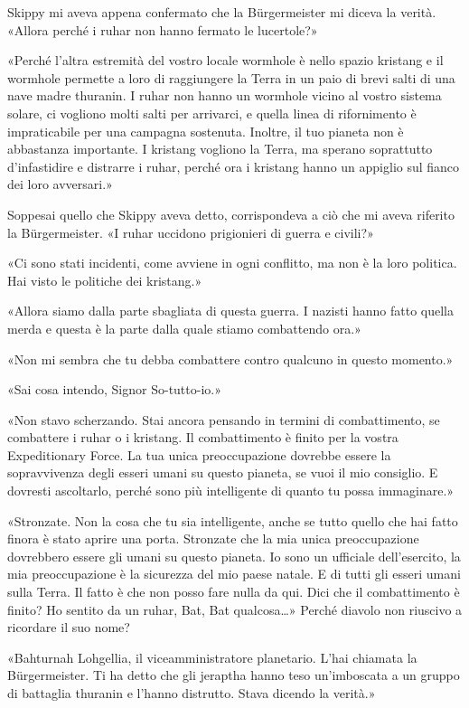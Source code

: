 Skippy mi aveva appena confermato che la Bürgermeister mi diceva la
verità. «Allora perché i ruhar non hanno fermato le lucertole?»

«Perché l'altra estremità del vostro locale wormhole è nello spazio
kristang e il wormhole permette a loro di raggiungere la Terra in un
paio di brevi salti di una nave madre thuranin. I ruhar non hanno un
wormhole vicino al vostro sistema solare, ci vogliono molti salti per
arrivarci, e quella linea di rifornimento è impraticabile per una
campagna sostenuta. Inoltre, il tuo pianeta non è abbastanza importante.
I kristang vogliono la Terra, ma sperano soprattutto d'infastidire e
distrarre i ruhar, perché ora i kristang hanno un appiglio sul fianco
dei loro avversari.»

Soppesai quello che Skippy aveva detto, corrispondeva a ciò che mi aveva
riferito la Bürgermeister. «I ruhar uccidono prigionieri di guerra e
civili?»

«Ci sono stati incidenti, come avviene in ogni conflitto, ma non è la
loro politica. Hai visto le politiche dei kristang.»

«Allora siamo dalla parte sbagliata di questa guerra. I nazisti hanno
fatto quella merda e questa è la parte dalla quale stiamo combattendo
ora.»

«Non mi sembra che tu debba combattere contro qualcuno in questo
momento.»

«Sai cosa intendo, Signor So-tutto-io.»

«Non stavo scherzando. Stai ancora pensando in termini di combattimento,
se combattere i ruhar o i kristang. Il combattimento è finito per la
vostra Expeditionary Force. La tua unica preoccupazione dovrebbe essere
la sopravvivenza degli esseri umani su questo pianeta, se vuoi il mio
consiglio. E dovresti ascoltarlo, perché sono più intelligente di quanto
tu possa immaginare.»

«Stronzate. Non la cosa che tu sia intelligente, anche se tutto quello
che hai fatto finora è stato aprire una porta. Stronzate che la mia
unica preoccupazione dovrebbero essere gli umani su questo pianeta. Io
sono un ufficiale dell'esercito, la mia preoccupazione è la sicurezza
del mio paese natale. E di tutti gli esseri umani sulla Terra. Il fatto
è che non posso fare nulla da qui. Dici che il combattimento è finito?
Ho sentito da un ruhar, Bat, Bat qualcosa\ldots» Perché diavolo non
riuscivo a ricordare il suo nome?

«Bahturnah Lohgellia, il viceamministratore planetario. L'hai chiamata
la Bürgermeister. Ti ha detto che gli jeraptha hanno teso un'imboscata a
un gruppo di battaglia thuranin e l'hanno distrutto. Stava dicendo la
verità.»

